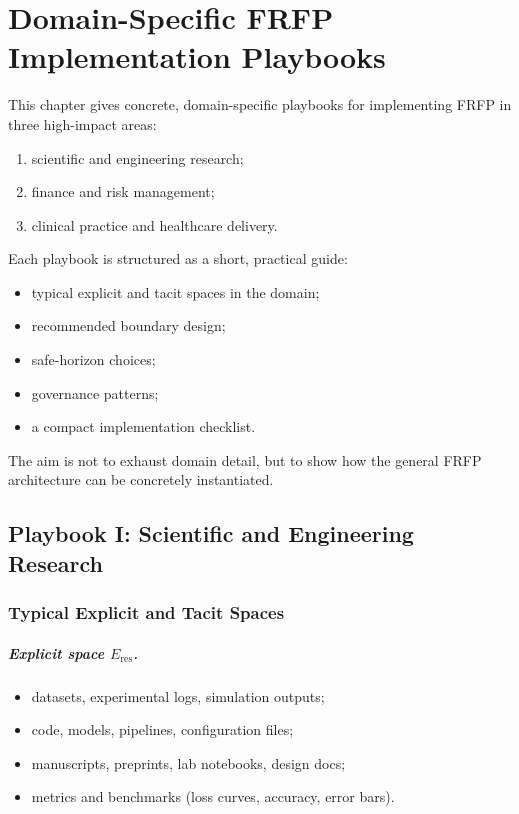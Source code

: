 \chapter{Domain-Specific FRFP Implementation Playbooks}
\label{ch:frfp-domain-playbooks}

This chapter gives concrete, domain-specific playbooks for implementing
FRFP in three high-impact areas:

\begin{enumerate}
  \item scientific and engineering research;
  \item finance and risk management;
  \item clinical practice and healthcare delivery.
\end{enumerate}

Each playbook is structured as a short, practical guide:

\begin{itemize}
  \item typical explicit and tacit spaces in the domain;
  \item recommended boundary design;
  \item safe-horizon choices;
  \item governance patterns;
  \item a compact implementation checklist.
\end{itemize}

The aim is not to exhaust domain detail, but to show how the general FRFP
architecture can be concretely instantiated.

\section{Playbook I: Scientific and Engineering Research}
\label{sec:playbook-research}

\subsection{Typical Explicit and Tacit Spaces}

\paragraph{Explicit space \(E_{\mathrm{res}}\).}

\begin{itemize}
  \item datasets, experimental logs, simulation outputs;
  \item code, models, pipelines, configuration files;
  \item manuscripts, preprints, lab notebooks, design docs;
  \item metrics and benchmarks (loss curves, accuracy, error bars).
\end{itemize}

